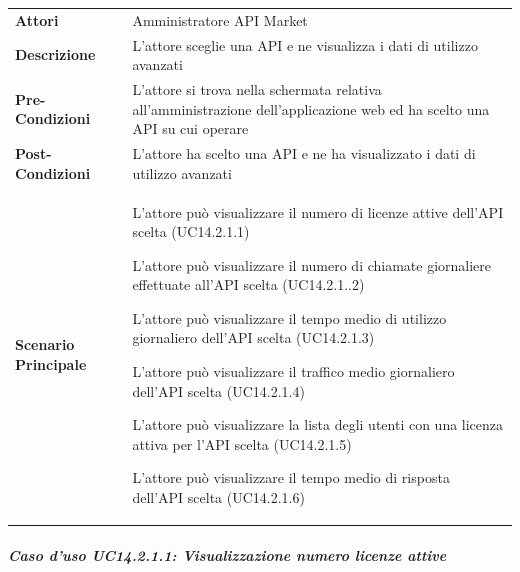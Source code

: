\begin{minipage}{\linewidth}
	\begin{tabular}{ l | p{11cm}}
		\hline
		\rowcolor{Gray}
		\multicolumn{2}{c}{UC14.2.1 - Visualizzazione dati di utilizzo avanzati} \\
		\hline
		\textbf{Attori} &  Amministratore API Market \\
		\textbf{Descrizione} & L'attore sceglie una API e ne visualizza i dati di utilizzo avanzati \\
		\textbf{Pre-Condizioni} & L'attore si trova nella schermata relativa all'amministrazione dell'applicazione web ed ha scelto una API su cui operare \\
		\textbf{Post-Condizioni} & L'attore ha scelto una API e ne ha visualizzato i dati di utilizzo avanzati \\
		\textbf{Scenario Principale} & 
		\begin{enumerate*}[label=(\arabic*.),itemjoin={\newline}]
			\item L'attore può visualizzare il numero di licenze attive dell'API scelta (UC14.2.1.1)
			\item L'attore può visualizzare il numero di chiamate giornaliere effettuate all'API scelta (UC14.2.1..2)
			\item L'attore può visualizzare il tempo medio di utilizzo giornaliero dell'API scelta (UC14.2.1.3)
			\item L'attore può visualizzare il traffico medio giornaliero dell'API scelta (UC14.2.1.4)
			\item L'attore può visualizzare la lista degli utenti con una licenza attiva per l'API scelta (UC14.2.1.5)
			\item L'attore può visualizzare il tempo medio di risposta dell'API scelta (UC14.2.1.6)
		\end{enumerate*}\\
	\end{tabular}
\end{minipage}

\subparagraph{Caso d'uso UC14.2.1.1: Visualizzazione numero licenze attive}
\label{UC14_2_1_1}

